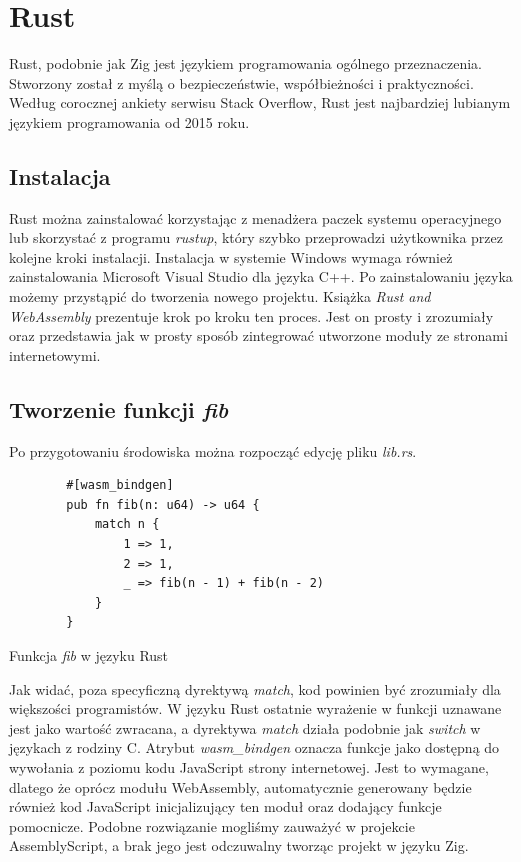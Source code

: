 \documentclass[language=polish,type=master]{aghmodern}
\begin{document}
\section{Rust}
Rust, podobnie jak Zig jest językiem programowania ogólnego przeznaczenia.
Stworzony został z myślą o bezpieczeństwie, współbieżności i praktyczności.
Według corocznej ankiety serwisu Stack Overflow\footnotemark{}, Rust jest najbardziej lubianym językiem programowania od 2015 roku.

\subsection{Instalacja}
Rust można zainstalować korzystając z menadżera paczek systemu operacyjnego lub skorzystać z programu \emph{rustup}\footnotemark{}, który szybko przeprowadzi użytkownika przez kolejne kroki instalacji.
Instalacja w systemie Windows wymaga również zainstalowania Microsoft Visual Studio dla języka C++.
Po zainstalowaniu języka możemy przystąpić do tworzenia nowego projektu.
Książka \emph{Rust and WebAssembly}\footnotemark{} prezentuje krok po kroku ten proces.
Jest on prosty i zrozumiały oraz przedstawia jak w prosty sposób zintegrować utworzone moduły ze stronami internetowymi.

\subsection{Tworzenie funkcji \emph{fib}}
Po przygotowaniu środowiska można rozpocząć edycję pliku \emph{lib.rs}.

\begin{listing}[H]
    \begin{verbatim}
        #[wasm_bindgen]
        pub fn fib(n: u64) -> u64 {
            match n {
                1 => 1,
                2 => 1,
                _ => fib(n - 1) + fib(n - 2)
            }
        }
    \end{verbatim}
    \caption{Funkcja \emph{fib} w języku Rust}
\end{listing}

Jak widać, poza specyficzną dyrektywą \emph{match}, kod powinien być zrozumiały dla większości programistów.
W języku Rust ostatnie wyrażenie w funkcji uznawane jest jako wartość zwracana, a dyrektywa \emph{match} działa podobnie jak \emph{switch} w językach z rodziny C.
Atrybut \emph{wasm\_bindgen} oznacza funkcje jako dostępną do wywołania z poziomu kodu JavaScript strony internetowej.
Jest to wymagane, dlatego że oprócz modułu WebAssembly, automatycznie generowany będzie również kod JavaScript inicjalizujący ten moduł oraz dodający funkcje pomocnicze.
Podobne rozwiązanie mogliśmy zauważyć w projekcie AssemblyScript, a brak jego jest odczuwalny tworząc projekt w języku Zig.
\end{document}
